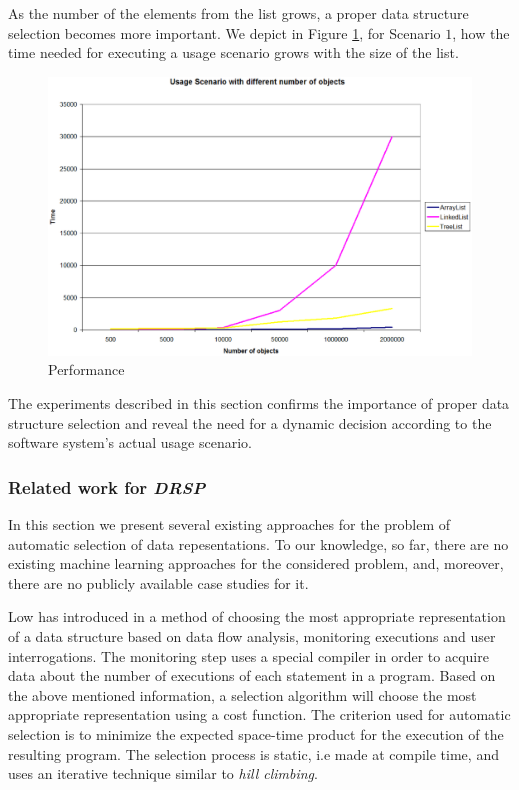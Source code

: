 As the number of the elements from the list grows, a proper data structure selection becomes more important. We depict in Figure \ref{perf}, for Scenario $1$, how the time needed for executing a usage scenario grows with the size of the list. 

\begin{figure}[h]
   \centering
          \includegraphics[scale=0.2]{performance.eps}
              \caption{Performance}
 \label{perf}
\end{figure}

The experiments described in this section confirms the importance of proper data structure selection and reveal the need for a dynamic decision according to the software system's actual usage scenario. 
  
\subsubsection{Related work for \emph{DRSP}}\label{rw}  

In this section we present several existing approaches for the problem of automatic selection of data repesentations. To our knowledge, so far, there are no existing machine learning approaches for the considered problem, and, moreover, there are no publicly available case studies for it. 

Low has introduced in \cite{Low} a method of choosing the most appropriate representation of a data structure based on data flow analysis, monitoring executions and user interrogations. The monitoring step uses a special compiler in order to acquire data about the number of executions of each statement in a program. Based on the above mentioned information, a selection algorithm will choose the most appropriate representation using a cost function. The criterion used for automatic selection is to minimize the expected space-time product for the execution of the resulting program. The selection process is static, i.e made at compile time, and uses an iterative technique similar to \emph{hill climbing}.

